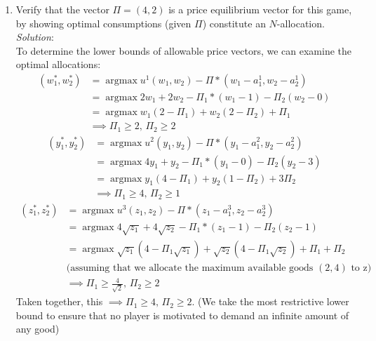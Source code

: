 \documentclass{article}
\DeclareMathOperator*{\argmax}{argmax}
\begin{document}
\begin{enumerate}
\begin{enumerate}




    \item Verify that the vector $\Pi = (4, 2)$ is a price equilibrium vector for this game, by showing optimal consumptions (given $\Pi$) constitute an $N$-allocation. \\

    \textit{Solution}: \\
    To determine the lower bounds of allowable price vectors, we can examine the optimal allocations:
    \begin{align*}
    (w_{1}^{*}, w_{2}^{*}) &= \argmax u^{1}(w_{1}, w_{2}) - \Pi * (w_{1} - a^{1}_{1}, w_{2} - a^{1}_{2}) \\
                           &= \argmax 2w_{1} + 2w_{2} - \Pi_{1} * (w_{1} - 1) - \Pi_{2}(w_{2} - 0) \\
                           &= \argmax w_{1}(2 - \Pi_{1}) + w_{2}(2 - \Pi_{2}) + \Pi_{1} \\
                           &\implies \Pi_{1} \ge 2,\, \Pi_{2} \ge 2
    \end{align*}
    \begin{align*}
    (y_{1}^{*}, y_{2}^{*}) &= \argmax u^{2}(y_{1}, y_{2}) - \Pi * (y_{1} - a^{2}_{1}, y_{2} - a^{2}_{2}) \\
                           &= \argmax 4y_{1} + y_{2} - \Pi_{1} * (y_{1} - 0) - \Pi_{2}(y_{2} - 3) \\
                           &= \argmax y_{1}(4 - \Pi_{1}) + y_{2}(1 - \Pi_{2}) + 3\Pi_{2} \\
                           &\implies \Pi_{1} \ge 4,\, \Pi_{2} \ge 1
    \end{align*}
    \begin{align*}
    (z_{1}^{*}, z_{2}^{*}) &= \argmax u^{3}(z_{1}, z_{2}) - \Pi * (z_{1} - a^{3}_{1}, z_{2} - a^{3}_{2}) \\
                           &= \argmax 4\sqrt{z_{1}} + 4\sqrt{z_{2}} - \Pi_{1} * (z_{1} - 1) - \Pi_{2}(z_{2} - 1) \\
                           &= \argmax \sqrt{z_{1}}(4 - \Pi_{1}\sqrt{z_{1}}) + \sqrt{z_{2}}(4 - \Pi_{1}\sqrt{z_{2}}) + \Pi_{1} + \Pi_{2} \\
                           & \text{(assuming that we allocate the maximum available goods } (2, 4) \text{ to z)} \\
                           &\implies \Pi_{1} \ge \frac{4}{\sqrt{2}},\, \Pi_{2} \ge 2
    \end{align*}
    Taken together, this $\implies \Pi_{1} \ge 4,\, \Pi_{2} \ge 2$. (We take the most restrictive lower bound to ensure that no player is motivated to demand an infinite amount of any good)


\end{enumerate}
\end{enumerate}
\end{document}

